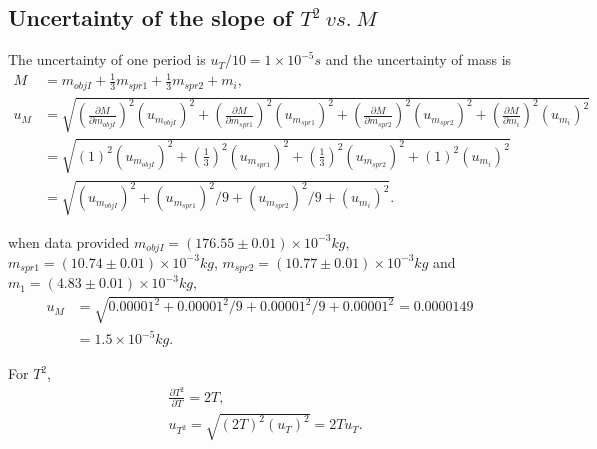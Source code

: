\subsection{Uncertainty of the slope of $T^2\ vs.\ M$}
    The uncertainty of one period is $u_T/10=1\times10^{-5}s$ and the uncertainty of mass is
    \[
    \begin{split}
        M&=m_{objI}+\frac{1}{3}m_{spr1}+\frac{1}{3}m_{spr2}+m_i,\\
        u_M&=\sqrt{
         (\frac{\partial M}{\partial m_{objI}})^2(u_{m_{objI}})^2
        +(\frac{\partial M}{\partial m_{spr1}})^2(u_{m_{spr1}})^2
        +(\frac{\partial M}{\partial m_{spr2}})^2(u_{m_{spr2}})^2
        +(\frac{\partial M}{\partial m_i})^2(u_{m_i})^2
        }\\
        &=\sqrt{
         (1)^2(u_{m_{objI}})^2
        +(\frac{1}{3})^2(u_{m_{spr1}})^2
        +(\frac{1}{3})^2(u_{m_{spr2}})^2
        +(1)^2(u_{m_i})^2
        }\\
        &=\sqrt{(u_{m_{objI}})^2+(u_{m_{spr1}})^2/9+(u_{m_{spr2}})^2/9+(u_{m_i})^2}.
    \end{split}
    \]

    when data provided 
	$m_{objI}=(176.55\pm0.01)\times10^{-3}kg$, $m_{spr1}=(10.74\pm0.01)\times10^{-3}kg$, $m_{spr2}=(10.77\pm0.01)\times10^{-3}kg$ and $m_1=(4.83\pm0.01)\times10^{-3}kg$,
    \[
    \begin{split}
        u_M & = \sqrt{0.00001^2+0.00001^2/9+0.00001^2/9+0.00001^2}=0.0000149\\
            & = 1.5\times10^{-5}kg.
    \end{split}
    \]

    For $T^2$,
    \[
    \begin{split}
        &\frac{\partial T^2}{\partial T}=2T,\\
        &u_{T^2}=\sqrt{(2T)^2(u_T)^2}=2Tu_T.
    \end{split}
    \]


